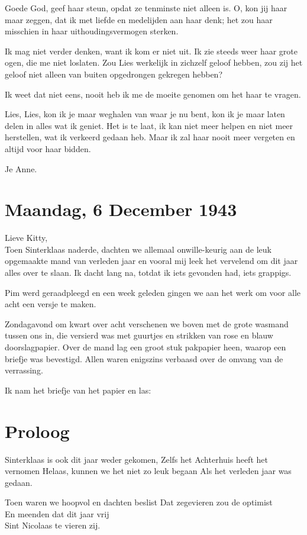 \documentclass{book}
\begin{document}
Goede God, geef haar steun, opdat ze tenminste niet alleen is. O, kon jij haar
maar zeggen, dat ik met liefde en medelijden aan haar denk; het zou haar
misschien in haar uithoudingsvermogen sterken.

Ik mag niet verder denken, want ik kom er niet uit. Ik zie steeds weer haar
grote ogen, die me niet loslaten. Zou Lies werkelijk in zichzelf geloof hebben,
zou zij het geloof niet alleen van buiten opgedrongen gekregen hebben?

Ik weet dat niet eens, nooit heb ik me de moeite genomen om het haar te vragen.

Lies, Lies, kon ik je maar weghalen van waar je nu bent, kon ik je maar laten
delen in alles wat ik geniet. Het is te laat, ik kan niet meer helpen en niet
meer herstellen, wat ik verkeerd gedaan heb. Maar ik zal haar nooit meer
vergeten en altijd voor haar bidden.

Je Anne.

\section*{Maandag, 6 December 1943}

Lieve Kitty,\\
Toen Sinterklaas naderde, dachten we allemaal onwille-keurig aan
de leuk opgemaakte mand van verleden jaar en vooral mij leek het vervelend om
dit jaar alles over te slaan. Ik dacht lang na, totdat ik iets gevonden had,
iets grappigs.

Pim werd geraadpleegd en een week geleden gingen we aan het werk om voor alle
acht een versje te maken.

Zondagavond om kwart over acht verschenen we boven met de grote wasmand tussen
ons in, die versierd was met guurtjes en strikken van rose en blauw
doorslagpapier. Over de mand lag een groot stuk pakpapier heen, waarop een
briefje was bevestigd. Allen waren enigszins verbaasd over de omvang van de
verrassing.

Ik nam het briefje van het papier en las:

\section*{Proloog}

Sinterklaas is ook dit jaar weder gekomen, Zelfs het Achterhuis heeft het
vernomen Helaas, kunnen we het niet zo leuk begaan Als het verleden jaar was
gedaan.

Toen waren we hoopvol en dachten beslist Dat zegevieren zou de optimist\\
En
meenden dat dit jaar vrij\\
Sint Nicolaas te vieren zij.
\end{document}
